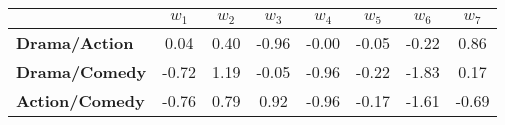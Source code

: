 \begin{tabular}{|l|c|c|c|c|c|c|c|}
\hline
&\textbf{$w_{1}$}&\textbf{$w_{2}$}&\textbf{$w_{3}$}&\textbf{$w_{4}$}&\textbf{$w_{5}$}&\textbf{$w_{6}$}&\textbf{$w_{7}$}\\\hline
\textbf{Drama/Action}&0.04&0.40&-0.96&-0.00&-0.05&-0.22&0.86\\\hline
\textbf{Drama/Comedy}&-0.72&1.19&-0.05&-0.96&-0.22&-1.83&0.17\\\hline
\textbf{Action/Comedy}&-0.76&0.79&0.92&-0.96&-0.17&-1.61&-0.69\\\hline
\end{tabular}
